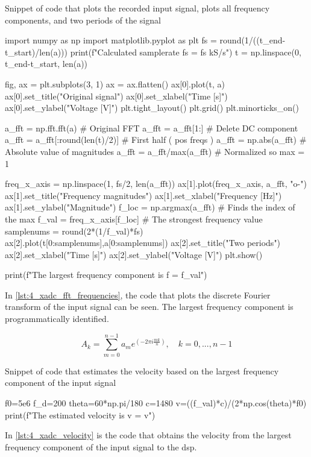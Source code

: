 \begin{listing}[htbp]
	\centering
	\caption{Snippet of code that plots the recorded input signal, plots all frequency components, and two periods of the signal}
	\label{lst:4_xadc_fft_frequencies}
	\begin{mintedpython}
import numpy as np
import matplotlib.pyplot as plt
fs = round(1/((t_end-t_start)/len(a)))
print(f"Calculated samplerate fs = {fs} kS/s")
t = np.linspace(0, t_end-t_start, len(a))

fig, ax = plt.subplots(3, 1)
ax = ax.flatten()
ax[0].plot(t, a)
ax[0].set_title("Original signal")
ax[0].set_xlabel("Time [s]")
ax[0].set_ylabel("Voltage [V]")
plt.tight_layout()
plt.grid()
plt.minorticks_on()

a_fft = np.fft.fft(a)           # Original FFT
a_fft = a_fft[1:]                 # Delete DC component
a_fft = a_fft[:round(len(t)/2)] # First half ( pos freqs )
a_fft = np.abs(a_fft)           # Absolute value of magnitudes
a_fft = a_fft/max(a_fft)        # Normalized so max = 1

freq_x_axis = np.linspace(1, fs/2, len(a_fft))
ax[1].plot(freq_x_axis, a_fft, "o-")
ax[1].set_title("Frequency magnitudes")
ax[1].set_xlabel("Frequency [Hz]")
ax[1].set_ylabel("Magnitude")
f_loc = np.argmax(a_fft) # Finds the index of the max
f_val = freq_x_axis[f_loc] # The strongest frequency value
samplenums = round(2*(1/f_val)*fs)
ax[2].plot(t[0:samplenums],a[0:samplenums])
ax[2].set_title("Two periods")
ax[2].set_xlabel("Time [s]")
ax[2].set_ylabel("Voltage [V]")
plt.show()

print(f"The largest frequency component is f = {f_val}")
	\end{mintedpython}
\end{listing}
In \cref{lst:4_xadc_fft_frequencies}, the code that plots the discrete Fourier transform of the input signal can be seen. The largest frequency component is programmatically identified.

\begin{equation} \label{eq:numpy_dft_formula}
	A_{k} = \sum_{m=0}^{n-1} a_{m} e^{\left( -2\pi i \frac{mk}{n}\right)}, \quad k=0,...,n-1
\end{equation}

\begin{listing}[htbp]
	\centering
	\caption{Snippet of code that estimates the velocity based on the largest frequency component of the input signal}
	\label{lst:4_xadc_velocity}
	\begin{mintedpython}
f0=5e6
f_d=200
theta=60*np.pi/180
c=1480
v=((f_val)*c)/(2*np.cos(theta)*f0)
print(f"The estimated velocity is v = {v}")
	\end{mintedpython}
\end{listing}
In \cref{lst:4_xadc_velocity} is the code that obtains the velocity from the largest frequency component of the input signal to the \gls{dsp}.





